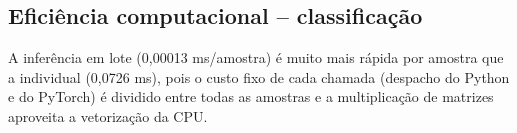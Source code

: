\documentclass[11pt,a4paper]{article}
\begin{document}
\subsection{Eficiência computacional -- classificação}
\begin{table}[H]\centering\scriptsize{}
\caption{Eficiência (classificação). Energia estimada como potência assumida (15 W) $\times$ tempo; CO$_2$ = kWh $\times$ 45,8 g/kWh (fator do Brasil, Aula 08).}\label{tab:ef_clf}\end{table}
A inferência em lote (0,00013 ms/amostra) é muito mais rápida por amostra que a individual (0,0726 ms), pois o custo fixo de cada chamada (despacho do Python e do PyTorch) é dividido entre todas as amostras e a multiplicação de matrizes aproveita a vetorização da CPU.
\end{document}
